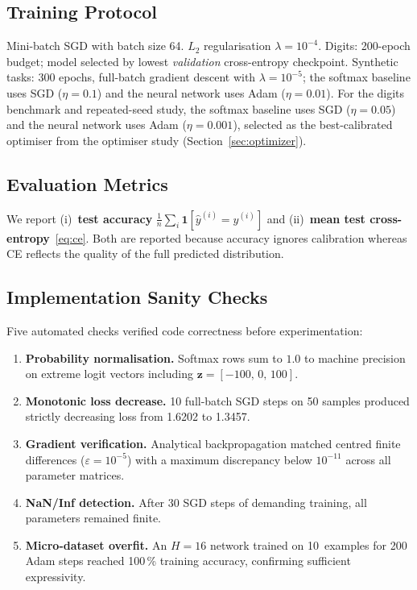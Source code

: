 \documentclass[sigconf,screen,nonacm]{acmart}
\newcommand{\1}{\mathbf{1}}
\newcommand{\vz}{\mathbf{z}}
\begin{document}
\subsection{Training Protocol}
Mini-batch SGD with batch size 64.  $L_2$ regularisation $\lambda{=}10^{-4}$.
Digits: 200-epoch budget; model selected by lowest \emph{validation}
cross-entropy checkpoint.  Synthetic tasks: 300 epochs, full-batch gradient
descent with $\lambda{=}10^{-5}$; the softmax baseline uses SGD
($\eta{=}0.1$) and the neural network uses Adam ($\eta{=}0.01$).
For the digits benchmark and repeated-seed study, the softmax baseline
uses SGD ($\eta{=}0.05$) and the neural network uses Adam ($\eta{=}0.001$),
selected as the best-calibrated optimiser from the optimiser study
(Section~\ref{sec:optimizer}).

\subsection{Evaluation Metrics}
We report (i)~\textbf{test accuracy}
$\frac{1}{n}\sum_{i}\mathbf{1}[\hat{y}^{(i)}{=}y^{(i)}]$ and
(ii)~\textbf{mean test cross-entropy}~\eqref{eq:ce}.  Both are reported
because accuracy ignores calibration whereas CE reflects the quality of the
full predicted distribution.

\subsection{Implementation Sanity Checks}
\label{sec:sanity}

Five automated checks verified code correctness before experimentation:
\begin{enumerate}[leftmargin=*]
  \item \textbf{Probability normalisation.}  Softmax rows sum to $1.0$ to
        machine precision on extreme logit vectors including
        $\vz{=}[-100,\,0,\,100]$.
  \item \textbf{Monotonic loss decrease.}  10 full-batch SGD steps on 50 samples
        produced strictly decreasing loss from 1.6202 to 1.3457.
  \item \textbf{Gradient verification.}  Analytical backpropagation matched
        centred finite differences ($\varepsilon{=}10^{-5}$) with a maximum
        discrepancy below $10^{-11}$ across all parameter matrices.
  \item \textbf{NaN/Inf detection.}  After 30 SGD steps of demanding training, all
        parameters remained finite.
  \item \textbf{Micro-dataset overfit.}  An $H{=}16$ network trained on
        10~examples for 200 Adam steps reached 100\,\% training accuracy,
        confirming sufficient expressivity.
\end{enumerate}
\end{document}
